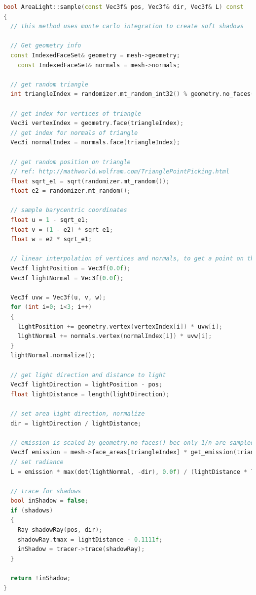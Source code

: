  \newpage
 \begin{lstlisting}[language=C++,caption=AreaLight::sample,label=lst:arealight::sample]
 bool AreaLight::sample(const Vec3f& pos, Vec3f& dir, Vec3f& L) const
{
  // this method uses monte carlo integration to create soft shadows

  // Get geometry info
  const IndexedFaceSet& geometry = mesh->geometry;
	const IndexedFaceSet& normals = mesh->normals;

  // get random triangle
  int triangleIndex = randomizer.mt_random_int32() % geometry.no_faces();
  
  // get index for vertices of triangle
  Vec3i vertexIndex = geometry.face(triangleIndex);
  // get index for normals of triangle
  Vec3i normalIndex = normals.face(triangleIndex);

  // get random position on triangle
  // ref: http://mathworld.wolfram.com/TrianglePointPicking.html
  float sqrt_e1 = sqrt(randomizer.mt_random());
  float e2 = randomizer.mt_random();

  // sample barycentric coordinates
  float u = 1 - sqrt_e1;
  float v = (1 - e2) * sqrt_e1;
  float w = e2 * sqrt_e1;
  
  // linear interpolation of vertices and normals, to get a point on the triangle and the according normal
  Vec3f lightPosition = Vec3f(0.0f);
  Vec3f lightNormal = Vec3f(0.0f);
  
  Vec3f uvw = Vec3f(u, v, w);
  for (int i=0; i<3; i++)
  {
    lightPosition += geometry.vertex(vertexIndex[i]) * uvw[i];
    lightNormal += normals.vertex(normalIndex[i]) * uvw[i];
  }
  lightNormal.normalize();
  
  // get light direction and distance to light
  Vec3f lightDirection = lightPosition - pos;
  float lightDistance = length(lightDirection);

  // set area light direction, normalize
  dir = lightDirection / lightDistance;
  
  // emission is scaled by geometry.no_faces() bec only 1/n are sampled
  Vec3f emission = mesh->face_areas[triangleIndex] * get_emission(triangleIndex) * geometry.no_faces();
  // set radiance
  L = emission * max(dot(lightNormal, -dir), 0.0f) / (lightDistance * lightDistance);

  // trace for shadows
  bool inShadow = false;
  if (shadows)
  {
    Ray shadowRay(pos, dir);
    shadowRay.tmax = lightDistance - 0.1111f;
    inShadow = tracer->trace(shadowRay);
  }

  return !inShadow;
}
 \end{lstlisting}
 
